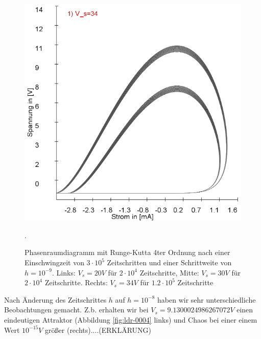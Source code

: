 \documentclass{scrartcl}
\begin{document}
\begin{figure}
\includegraphics[scale=0.28]{schwing-runge-nach300k-weitere120k-10-9-34V}
\caption{Phasenraumdiagramm mit Runge-Kutta 4ter Ordnung nach einer Einschwingzeit von  $3\cdot10^5$ Zeitschritten und einer Schrittweite von $h=10^{-9}$. Links: $V_s=20V$ für $2\cdot10^4$ Zeitschritte, Mitte: $V_s=30V$ für $2\cdot10^4$ Zeitschritte. Rechts: $V_s=34V$ für $1.2\cdot10^5$ Zeitschritte}. 
\label{fig:ldr-0003}
\end{figure}
\newline
Nach Änderung des Zeitschrittes $h$ auf $h=10^{-8}$ haben wir sehr unterschiedliche Beobachtungen gemacht. Z.b. erhalten wir bei $V_s=9.1300024986267072V$ einen eindeutigen Attraktor (Abbildung \ref{fig:ldr-0004} links) und Chaos bei einer einem Wert $10^{-15}V$ größer (rechts)....(ERKLÄRUNG)
\end{document}
